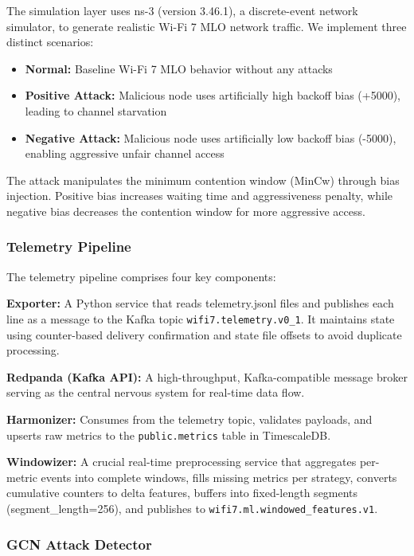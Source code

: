 \documentclass[conference]{IEEEtran}
\begin{document}
The simulation layer uses ns-3 (version 3.46.1), a discrete-event network simulator, to generate realistic Wi-Fi 7 MLO network traffic. We implement three distinct scenarios:

\begin{itemize}
    \item \textbf{Normal:} Baseline Wi-Fi 7 MLO behavior without any attacks
    \item \textbf{Positive Attack:} Malicious node uses artificially high backoff bias (+5000), leading to channel starvation
    \item \textbf{Negative Attack:} Malicious node uses artificially low backoff bias (-5000), enabling aggressive unfair channel access
\end{itemize}

The attack manipulates the minimum contention window (MinCw) through bias injection. Positive bias increases waiting time and aggressiveness penalty, while negative bias decreases the contention window for more aggressive access.

\subsubsection{Telemetry Pipeline}

The telemetry pipeline comprises four key components:

\textbf{Exporter:} A Python service that reads telemetry.jsonl files and publishes each line as a message to the Kafka topic \texttt{wifi7.telemetry.v0\_1}. It maintains state using counter-based delivery confirmation and state file offsets to avoid duplicate processing.

\textbf{Redpanda (Kafka API):} A high-throughput, Kafka-compatible message broker serving as the central nervous system for real-time data flow.

\textbf{Harmonizer:} Consumes from the telemetry topic, validates payloads, and upserts raw metrics to the \texttt{public.metrics} table in TimescaleDB.

\textbf{Windowizer:} A crucial real-time preprocessing service that aggregates per-metric events into complete windows, fills missing metrics per strategy, converts cumulative counters to delta features, buffers into fixed-length segments (segment\_length=256), and publishes to \texttt{wifi7.ml.windowed\_features.v1}.

\subsubsection{GCN Attack Detector}
\end{document}
